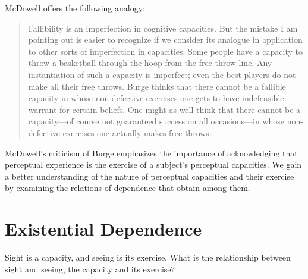 \documentclass[12pt]{article}
\begin{document}
McDowell offers the following analogy:
\begin{quote}
	Fallibility is an imperfection in cognitive capacities. But the mistake I am pointing out is easier to recognize if we consider its analogue in application to other sorts of imperfection in capacities. Some people have a capacity to throw a basketball through the hoop from the free-throw line. Any instantiation of such a capacity is imperfect; even the best players do not make all their free throws. Burge thinks that there cannot be a fallible capacity in whose non-defective exercises one gets to have indefeasible warrant for certain beliefs. One might as well think that there cannot be a capacity---of course not guaranteed success on all occasions---in whose non-defective exercises one actually makes free throws. \citep[245--6]{McDowell:2010fk}
\end{quote}
McDowell's criticism of Burge emphasizes the importance of acknowledging that perceptual experience is the exercise of a subject's perceptual capacities. We gain a better understanding of the nature of perceptual capacities and their exercise by examining the relations of dependence that obtain among them.



\section{Existential Dependence} %
\label{sec:capacities_and_their_exercise}

Sight is a capacity, and seeing is its exercise. What is the relationship between sight and seeing, the capacity and its exercise?
\end{document}
